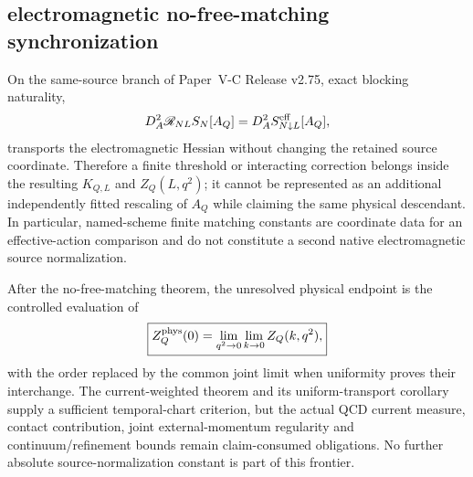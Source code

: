 \documentclass[12pt,a4paper]{article}
\begin{document}

\subsection{electromagnetic no-free-matching synchronization}
\label{p12:sec:v2100-g17-no-free-matching-sync}

\begin{corollary}
\label{p12:cor:v2100-g17-no-free-matching}
On the same-source branch of Paper~V-C Release v2.75, exact blocking
naturality,
\[
 D_A^2\mathscr R_{NL}S_N[A_Q]=D_A^2S^{\rm eff}_{N\downarrow L}[A_Q],
\]
transports the electromagnetic Hessian without changing the retained source
coordinate.  Therefore a finite threshold or interacting correction belongs
inside the resulting $K_{Q,L}$ and $Z_Q(L,q^2)$; it cannot be represented as
an additional independently fitted rescaling of $A_Q$ while claiming the same
physical descendant.  In particular, named-scheme finite matching constants
are coordinate data for an effective-action comparison and do not constitute
a second native electromagnetic source normalization.
\end{corollary}

\begin{corollary}
\label{p12:cor:v2100-thomson-frontier}
After the no-free-matching theorem, the unresolved physical endpoint is the
controlled evaluation of
\[
 \boxed{
 Z_Q^{\rm phys}(0)
 =\lim_{q^2\to0}\lim_{k\to0}Z_Q(k,q^2),}
\]
with the order replaced by the common joint limit when uniformity proves their
interchange.  The current-weighted theorem and its uniform-transport
corollary supply a sufficient temporal-chart criterion, but the actual QCD
current measure, contact contribution, joint external-momentum regularity and
continuum/refinement bounds remain claim-consumed obligations.  No further
absolute source-normalization constant is part of this frontier.
\end{corollary}


\end{document}
